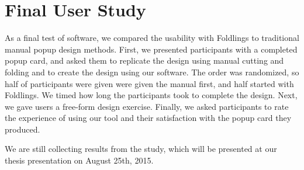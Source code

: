\section{Final User Study}\label{final-user-study}

As a final test of software, we compared the usability with Foldlings to
traditional manual popup design methods. First, we presented
participants with a completed popup card, and asked them to replicate
the design using manual cutting and folding and to create the design
using our software. The order was randomized, so half of participants
were given were given the manual first, and half started with Foldlings.
We timed how long the participants took to complete the design. Next, we
gave users a free-form design exercise. Finally, we asked participants
to rate the experience of using our tool and their satisfaction with the
popup card they produced.

We are still collecting results from the study, which will be presented
at our thesis presentation on August 25th, 2015.
